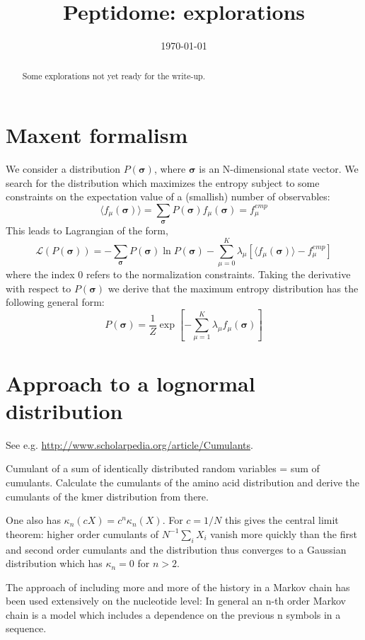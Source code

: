 \documentclass[superscriptaddress,onecolumn,pre]{revtex4}
\newcommand{\B}{\boldsymbol}
\newcommand{\<}{\langle}
\renewcommand{\>}{\rangle}
\def\[[{\left[}
\def\]]{\right]}
\begin{document}
\title{Peptidome: explorations}
\date{\today}

\begin{abstract}
    Some explorations not yet ready for the write-up.
\end{abstract}

\maketitle

\section{Maxent formalism}
We consider a distribution $P(\boldsymbol \sigma)$, where $\boldsymbol \sigma$ is an N-dimensional state vector. We search for the distribution which maximizes the entropy subject to some constraints on the expectation value of a (smallish) number of observables:
\begin{equation}
\langle f_\mu(\boldsymbol \sigma)\rangle = \sum_{\boldsymbol \sigma} P(\boldsymbol \sigma) f_\mu(\boldsymbol \sigma) = f_\mu^{emp}
\end{equation}
This leads to Lagrangian of the form,
\begin{equation}
    \mathcal{L}(P(\B \sigma)) = - \sum_{\B \sigma} P(\B \sigma) \ln P(\B \sigma) - \sum_{\mu = 0}^K \lambda_\mu \[[ \langle f_\mu(\boldsymbol \sigma) \rangle - f_\mu^{emp} \]]
\end{equation}
where the index 0 refers to the normalization constraints. Taking the derivative with respect to $P(\B \sigma)$ we derive that the maximum entropy distribution has the following general form:
\begin{equation}
    P(\boldsymbol \sigma) = \frac{1}{Z} \exp\left[ -\sum_{\mu=1}^K \lambda_\mu f_\mu(\boldsymbol \sigma) \right]
\end{equation}


\section{Approach to a lognormal distribution}

See e.g. \url{http://www.scholarpedia.org/article/Cumulants}.

Cumulant of a sum of identically distributed random variables = sum of cumulants. Calculate the cumulants of the amino acid distribution and derive the cumulants of the kmer distribution from there.

One also has $\kappa_n(c X) = c^n \kappa_n(X)$. For $c = 1/N$ this gives the central limit theorem: higher order cumulants of $N^{-1} \sum_i X_i$ vanish more quickly than the first and second order cumulants and the distribution thus converges to a Gaussian distribution which has $\kappa_n = 0$ for $n>2$.

The approach of including more and more of the history in a Markov chain has been used extensively on the nucleotide level: In general an n-th order Markov chain is a model which includes a dependence on the previous n symbols in a sequence.
\end{document}

